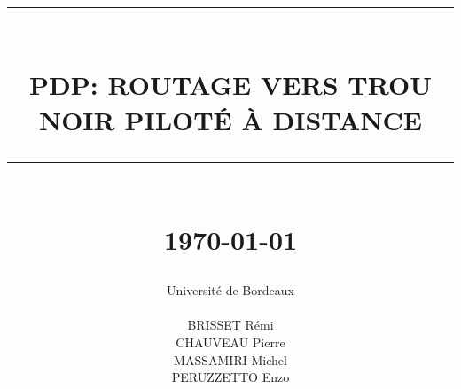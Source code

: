 \documentclass[11pt]{report}
\newcommand{\HRule}[1]{\rule{\linewidth}{#1}}
\begin{document}
\title
{
	\Large{}
	\HRule{2pt} \\ [0.5cm]
	\LARGE \textbf{\uppercase{PDP: Routage vers trou noir piloté à distance}}
	\HRule{2pt} \\ [0.5cm]
    	\normalsize \today
}

\date{}


\author
{
	\LARGE{Université de Bordeaux} \\
	\\
    BRISSET Rémi \\
    CHAUVEAU Pierre\\
    MASSAMIRI Michel \\
    PERUZZETTO Enzo \\
}

\maketitle
\tableofcontents








\end{document}
